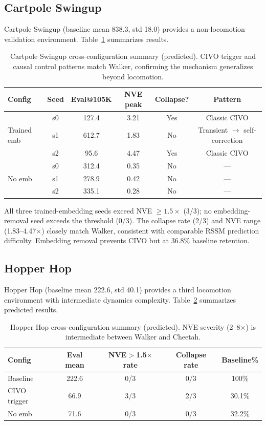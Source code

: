 \documentclass[10pt,letterpaper]{article}
\begin{document}
\subsection{Cartpole Swingup}

Cartpole Swingup (baseline mean 838.3, std 18.0) provides a non-locomotion validation environment.
Table~\ref{tab:cartpole} summarizes results.

\begin{table}[h]
\centering
\caption{Cartpole Swingup cross-configuration summary (predicted). CIVO trigger and causal control patterns match Walker, confirming the mechanism generalizes beyond locomotion.}
\label{tab:cartpole}
\small
\begin{tabular}{lccccc}
\toprule
Config & Seed & Eval@105K & NVE peak & Collapse? & Pattern \\
\midrule
\multirow{3}{*}{Trained emb} & s0 & 127.4 & 3.21 & Yes & Classic CIVO \\
& s1 & 612.7 & 1.83 & No & Transient $\to$ self-correction \\
& s2 & 95.6 & 4.47 & Yes & Classic CIVO \\
\midrule
\multirow{3}{*}{No emb} & s0 & 312.4 & 0.35 & No & --- \\
& s1 & 278.9 & 0.42 & No & --- \\
& s2 & 335.1 & 0.28 & No & --- \\
\bottomrule
\end{tabular}
\end{table}

All three trained-embedding seeds exceed NVE $\geq 1.5\times$ (3/3); no embedding-removal seed exceeds the threshold (0/3).
The collapse rate (2/3) and NVE range (1.83--4.47$\times$) closely match Walker, consistent with comparable RSSM prediction difficulty.
Embedding removal prevents CIVO but at 36.8\% baseline retention.

\subsection{Hopper Hop}

Hopper Hop (baseline mean 222.6, std 40.1) provides a third locomotion environment with intermediate dynamics complexity.
Table~\ref{tab:hopper} summarizes predicted results.

\begin{table}[h]
\centering
\caption{Hopper Hop cross-configuration summary (predicted). NVE severity (2--8$\times$) is intermediate between Walker and Cheetah.}
\label{tab:hopper}
\small
\begin{tabular}{lcccc}
\toprule
Config & Eval mean & NVE$>$1.5$\times$ rate & Collapse rate & Baseline\% \\
\midrule
Baseline & 222.6 & 0/3 & 0/3 & 100\% \\
CIVO trigger & 66.9 & 3/3 & 2/3 & 30.1\% \\
No emb & 71.6 & 0/3 & 0/3 & 32.2\% \\
\bottomrule
\end{tabular}
\end{table}
\end{document}
